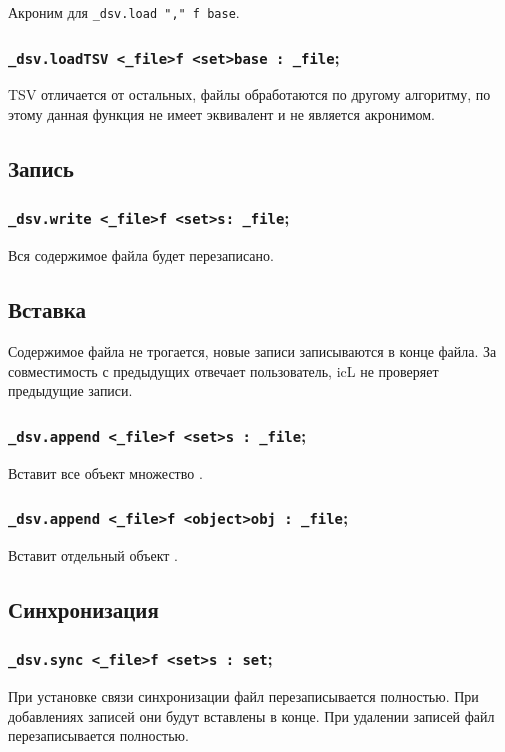 Акроним для \lstinline|_dsv.load "," f base|.

\subsubsection{\lstinline|_dsv.loadTSV <_file>f <set>base : _file|;}

TSV отличается от остальных, файлы обработаются по другому алгоритму, по этому данная функция не имеет эквивалент и не является акронимом.

\subsection{Запись}

\subsubsection{\lstinline|_dsv.write <_file>f <set>s: _file|;}

Вся содержимое файла будет перезаписано.

\subsection{Вставка}

Содержимое файла не трогается, новые записи записываются в конце файла. За совместимость с предыдущих отвечает пользователь, icL не проверяет предыдущие записи.

\subsubsection{\lstinline|_dsv.append <_file>f <set>s : _file|;}

Вставит все объект множество .

\subsubsection{\lstinline|_dsv.append <_file>f <object>obj : _file|;}

Вставит отдельный объект .

\subsection{Синхронизация}

\subsubsection{\lstinline|_dsv.sync <_file>f <set>s : set|;}

При установке связи синхронизации файл перезаписывается полностью. При добавлениях записей они будут вставлены в конце. При удалении записей файл перезаписывается полностью.

